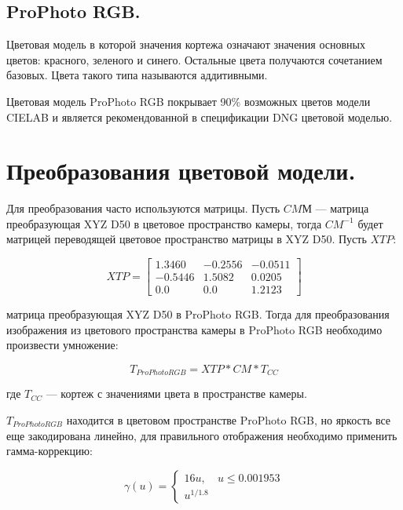 
\subsection{ProPhoto RGB.}
Цветовая модель в которой значения кортежа означают значения основных цветов: красного, зеленого и синего. Остальные цвета получаются сочетанием базовых. Цвета такого типа называются аддитивными.

Цветовая модель ProPhoto RGB покрывает 90\% возможных цветов модели CIELAB и является рекомендованной в спецификации DNG цветовой моделью. \cite{dngspec}


\section{Преобразования цветовой модели.}

Для преобразования часто используются матрицы. Пусть $CMМ$ --- матрица преобразующая XYZ D50 в цветовое пространство камеры, тогда $CM^{-1}$ будет матрицей переводящей цветовое пространство матрицы в XYZ D50. Пусть $XTP$:

\begin{equation}
	\label{XTP}
	XTP = \begin{bmatrix}
			1.3460 & -0.2556 & -0.0511 \\
			-0.5446 & 1.5082 & 0.0205 \\
			0.0 & 0.0 & 1.2123 
		\end{bmatrix}
\end{equation}

матрица преобразующая XYZ D50 в ProPhoto RGB. Тогда для преобразования изображения из цветового пространства камеры в ProPhoto RGB необходимо произвести умножение:

\begin{equation}
	\label{tosrgb}
	T_{ProPhoto RGB} = XTP * CM * T_{CC}
\end{equation}

где $T_{CC}$ --- кортеж с значениями цвета в пространстве камеры.

$T_{ProPhoto RGB}$ находится в цветовом пространстве ProPhoto RGB, но яркость все еще закодирована линейно, для правильного отображения необходимо применить гамма-коррекцию:

\begin{equation}
	\label{gamma}
	\gamma(u) = 
	\begin{cases}
		16u, & u \le 0.001953 \\
		u^{1/1.8}
	\end{cases}
\end{equation}

